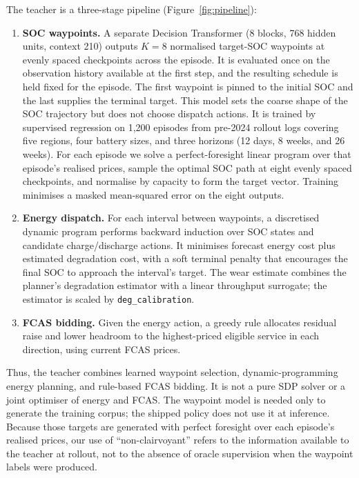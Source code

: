 \documentclass{article}
\begin{document}
The teacher is a three-stage pipeline (Figure~\ref{fig:pipeline}):
\begin{enumerate}
  \item \textbf{SOC waypoints.} A separate Decision Transformer (8 blocks,
  768 hidden units, context 210) outputs $K{=}8$ normalised target-SOC
  waypoints at evenly spaced checkpoints across the episode. It is evaluated
  once on the observation history available at the first step, and the
  resulting schedule is held fixed for the episode. The first waypoint is
  pinned to the initial SOC and the last supplies the terminal target. This
  model sets the coarse shape of the SOC trajectory but does not choose
  dispatch actions. It is trained by supervised regression on 1{,}200 episodes
  from pre-2024 rollout logs covering five regions, four battery sizes, and
  three horizons (12 days, 8 weeks, and 26 weeks). For each episode we solve a
  perfect-foresight linear program over that episode's realised prices, sample
  the optimal SOC path at eight evenly spaced checkpoints, and normalise by
  capacity to form the target vector. Training minimises a masked
  mean-squared error on the eight outputs.
  \item \textbf{Energy dispatch.} For each interval between waypoints, a
  discretised dynamic program performs backward induction over SOC states
  and candidate charge/discharge actions. It minimises forecast energy cost
  plus estimated degradation cost, with a soft terminal penalty that
  encourages the final SOC to approach the interval's target. The wear
  estimate combines the planner's degradation estimator with a linear
  throughput surrogate; the estimator is scaled by
  \texttt{deg\_calibration}.
  \item \textbf{FCAS bidding.} Given the energy action, a greedy rule
  allocates residual raise and lower headroom to the highest-priced eligible
  service in each direction, using current FCAS prices.
\end{enumerate}
Thus, the teacher combines learned waypoint selection, dynamic-programming
energy planning, and rule-based FCAS bidding. It is not a pure SDP solver
or a joint optimiser of energy and FCAS. The waypoint model is needed only to
generate the training corpus; the shipped policy does not use it at inference.
Because those targets are generated with perfect foresight over each episode's
realised prices, our use of ``non-clairvoyant'' refers to the information
available to the teacher at rollout, not to the absence of oracle supervision
when the waypoint labels were produced.
\end{document}
